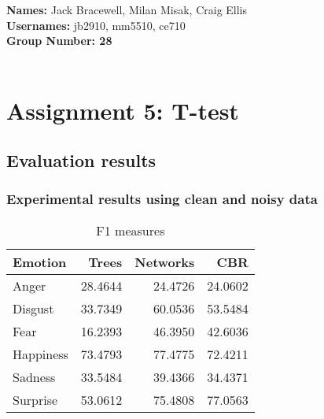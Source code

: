 \documentclass[12pt]{article}
\begin{document}
{\bf Names:} Jack Bracewell, Milan Misak, Craig Ellis \\
{\bf Usernames:} jb2910, mm5510, ce710 \\
{\bf Group Number: 28}  \\ \\

\section*{Assignment 5: T-test}

\subsection*{Evaluation results}

\subsubsection*{Experimental results using clean and noisy data}
\begin{table}[h]
\centering
\begin{tabular}{l | r r r}
Emotion   & Trees   & Networks & CBR     \\
\hline
Anger     & 28.4644 & 24.4726  & 24.0602 \\
Disgust   & 33.7349 & 60.0536  & 53.5484 \\
Fear      & 16.2393 & 46.3950  & 42.6036 \\
Happiness & 73.4793 & 77.4775  & 72.4211 \\
Sadness   & 33.5484 & 39.4366  & 34.4371 \\
Surprise  & 53.0612 & 75.4808  & 77.0563 \\
\end{tabular}
\caption{F1 measures}
\end{table}
\end{document}
